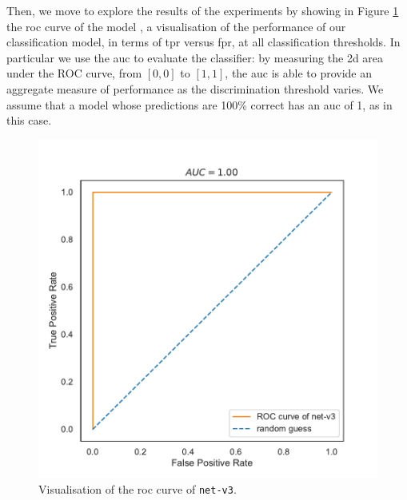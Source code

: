 Then, we move to explore the results of the experiments by showing in Figure 
\ref{fig:net-v3auc} the \gls{roc} curve of the model 
\cite[][]{fawcett2006introduction}, a visualisation of the performance of our 
classification model, in terms of \gls{tpr} versus \gls{fpr}, at all classification 
thresholds.
In particular we use the \gls{auc} to evaluate the classifier: by measuring the 
\gls{2d} area under the ROC curve, from $[0, 0]$ to $[1, 1]$, the \gls{auc} is able 
to provide an aggregate measure of performance as the discrimination threshold 
varies.
We assume that a model whose predictions are 100\% correct has an \gls{auc} of 
1, as in this case.
\begin{figure}[!htb]
	\centering
	\includegraphics[width=.5\textwidth]{contents/images/net-v3/roc-net-v3(a)}%
	\caption[Evaluation of the ROC of \texttt{net-v3}.]{Visualisation of the 
		\gls{roc} curve of \texttt{net-v3}.}
	\label{fig:net-v3auc}
\end{figure}


